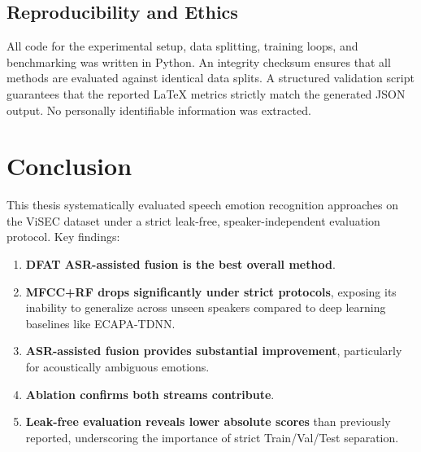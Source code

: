 \documentclass[12pt,a4paper]{report}
\begin{document}
\section{Reproducibility and Ethics}
All code for the experimental setup, data splitting, training loops, and benchmarking was written in Python. An integrity checksum ensures that all methods are evaluated against identical data splits. A structured validation script guarantees that the reported LaTeX metrics strictly match the generated JSON output. No personally identifiable information was extracted.

\chapter{Conclusion}
This thesis systematically evaluated speech emotion recognition approaches on the ViSEC dataset under a strict leak-free, speaker-independent evaluation protocol. Key findings:
\begin{enumerate}
    \item \textbf{DFAT ASR-assisted fusion is the best overall method}.
    \item \textbf{MFCC+RF drops significantly under strict protocols}, exposing its inability to generalize across unseen speakers compared to deep learning baselines like ECAPA-TDNN.
    \item \textbf{ASR-assisted fusion provides substantial improvement}, particularly for acoustically ambiguous emotions.
    \item \textbf{Ablation confirms both streams contribute}.
    \item \textbf{Leak-free evaluation reveals lower absolute scores} than previously reported, underscoring the importance of strict Train/Val/Test separation.
\end{enumerate}



\end{document}
